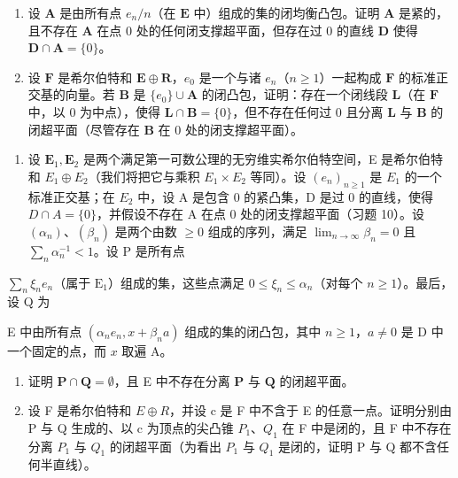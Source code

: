 \begin{enumerate}
\def\labelenumi{\alph{enumi})}
\item
  设 \(\mathbf{A}\) 是由所有点 \(e_n / n\)（在 \(\mathbf{E}\) 中）组成的集的闭均衡凸包。证明 \(\mathbf{A}\) 是紧的，且不存在 \(\mathbf{A}\) 在点 0 处的任何闭支撑超平面，但存在过 0 的直线 \(\mathbf{D}\) 使得 \(\mathbf{D} \cap \mathbf{A} = \{0\}\)。
\item
  设 \(\mathbf{F}\) 是希尔伯特和 \(\mathbf{E} \oplus \mathbf{R}\)，\(e_0\) 是一个与诸 \(e_n\)（\(n \geqslant 1\)）一起构成 \(\mathbf{F}\) 的标准正交基的向量。若 \(\mathbf{B}\) 是 \(\{e_0\} \cup \mathbf{A}\) 的闭凸包，证明：存在一个闭线段 \(\mathbf{L}\)（在 \(\mathbf{F}\) 中，以 0 为中点），使得 \(\mathbf{L} \cap \mathbf{B} = \{0\}\)，但不存在任何过 0 且分离 \(\mathbf{L}\) 与 \(\mathbf{B}\) 的闭超平面（尽管存在 \(\mathbf{B}\) 在 0 处的闭支撑超平面）。
\end{enumerate}

\begin{enumerate}
\def\labelenumi{\arabic{enumi})}
\setcounter{enumi}{10}
\tightlist
\item
  设 \(\mathbf{E}_1, \mathbf{E}_2\) 是两个满足第一可数公理的无穷维实希尔伯特空间，E 是希尔伯特和 \(E_{1} \oplus E_{2}\)（我们将把它与乘积 \(E_{1} \times E_{2}\) 等同）。设 \((e_{n})_{n \geqslant 1}\) 是 \(E_{1}\) 的一个标准正交基；在 \(E_{2}\) 中，设 A 是包含 0 的紧凸集，D 是过 0 的直线，使得 \(D \cap A = \{0\}\)，并假设不存在 A 在点 0 处的闭支撑超平面（习题 10）。设 \((\alpha_{n})\)、\((\beta_{n})\) 是两个由数 \(\geqslant 0\) 组成的序列，满足 \(\lim_{n \to \infty} \beta_{n} = 0\) 且 \(\sum_{n} \alpha_{n}^{-1} < 1\)。设 P 是所有点
\end{enumerate}

\(\sum_{n}\xi_{n}e_{n}\)（属于 \(\mathrm{E}_1\)）组成的集，这些点满足 \(0\leqslant \xi_n\leqslant \alpha_n\)（对每个 \(n\geqslant 1\)）。最后，设 Q 为

E 中由所有点 \((\alpha_{n}e_{n}, x + \beta_{n}a)\) 组成的集的闭凸包，其中 \(n \geqslant 1\)，\(a \neq 0\) 是 D 中一个固定的点，而 \(x\) 取遍 A。

\begin{enumerate}
\def\labelenumi{\alph{enumi})}
\item
  证明 \(\mathbf{P} \cap \mathbf{Q} = \emptyset\)，且 E 中不存在分离 \(\mathbf{P}\) 与 \(\mathbf{Q}\) 的闭超平面。
\item
  设 F 是希尔伯特和 \(E \oplus R\)，并设 c 是 F 中不含于 E 的任意一点。证明分别由 P 与 Q 生成的、以 c 为顶点的尖凸锥 \(P_{1}\)、\(Q_{1}\) 在 F 中是闭的，且 F 中不存在分离 \(P_{1}\) 与 \(Q_{1}\) 的闭超平面（为看出 \(P_{1}\) 与 \(Q_{1}\) 是闭的，证明 P 与 Q 都不含任何半直线）。
\end{enumerate}


